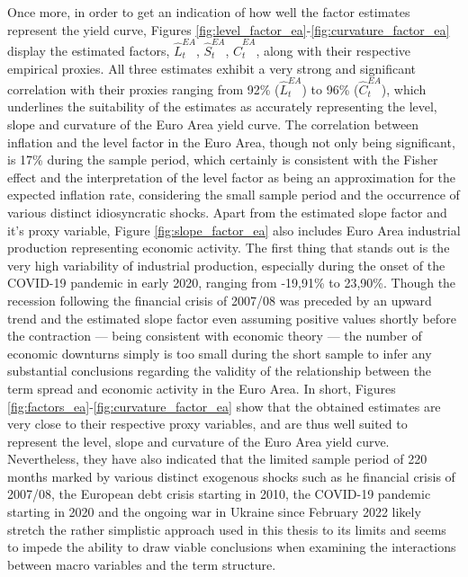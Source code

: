 Once more, in order to get an indication of how well the factor estimates represent the yield curve, Figures \ref{fig:level_factor_ea}-\ref{fig:curvature_factor_ea} display the estimated factors, $\hat{L}^{EA}_{t}$, $\hat{S}^{EA}_{t}$, $\hat{C}^{EA}_{t}$, along with their respective empirical proxies. 
All three estimates exhibit a very strong and significant correlation with their proxies ranging from 92\% ($\hat{L}^{EA}_{t}$) to 96\% ($\hat{C}^{EA}_{t}$), which underlines the suitability of the estimates as accurately representing the level, slope and curvature of the Euro Area yield curve. 
The correlation between inflation and the level factor in the Euro Area, though not only being significant, is 17\% during the sample period, which certainly is consistent with the Fisher effect and the interpretation of the level factor as being an approximation for the expected inflation rate, considering the small sample period and the occurrence of various distinct idiosyncratic shocks. 
Apart from the estimated slope factor and it's proxy variable, Figure \ref{fig:slope_factor_ea} also includes Euro Area industrial production representing economic activity. The first thing that stands out is the very high variability of industrial production, especially during the onset of the COVID-19 pandemic in early 2020, ranging from -19,91\% to 23,90\%. 
Though the recession following the financial crisis of 2007/08 was preceded by an upward trend and the estimated slope factor even assuming positive values shortly before the contraction --- being consistent with economic theory --- the number of economic downturns simply is too small during the short sample to infer any substantial conclusions regarding the validity of the relationship between the term spread and economic activity in the Euro Area. 
In short, Figures \ref{fig:factors_ea}-\ref{fig:curvature_factor_ea} show that the obtained estimates are very close to their respective proxy variables, and are thus well suited to represent the level, slope and curvature of the Euro Area yield curve. Nevertheless, they have also indicated that the limited sample period of 220 months marked by various distinct exogenous shocks such as he financial crisis of 2007/08, the European debt crisis starting in 2010, the COVID-19 pandemic starting in 2020 and the ongoing war in Ukraine since February 2022 likely stretch the rather simplistic approach used in this thesis to its limits and seems to impede the ability to draw viable conclusions when examining the interactions between macro variables and the term structure.  

